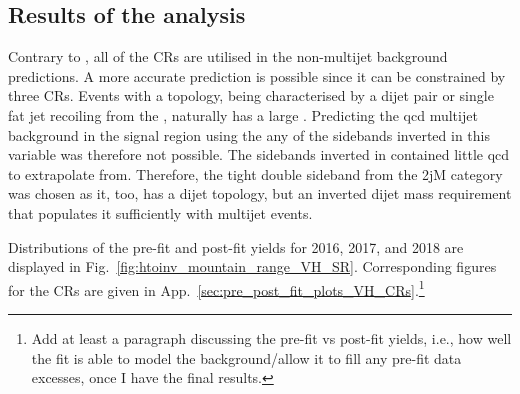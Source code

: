 \clearpage




\subsection{Results of the \texorpdfstring{\VH}{VH} analysis}
\label{subsec:htoinv_analysis_VH}

Contrary to \ttH, all of the \glspl{CR} are utilised in the non-multijet background predictions. A more accurate \ztonunu prediction is possible since it can be constrained by three \glspl{CR}. Events with a \VH topology, being characterised by a dijet pair or single fat jet recoiling from the \ptvecmiss, naturally has a large \mindphi. Predicting the \acrshort{qcd} multijet background in the signal region using the any of the sidebands inverted in this variable was therefore not possible. The sidebands inverted in \omegaTilde contained little \acrshort{qcd} to extrapolate from. Therefore, the tight double sideband from the \ggH 2jM category was chosen as it, too, has a dijet topology, but an inverted dijet mass requirement that populates it sufficiently with multijet events.

Distributions of the pre-fit and post-fit yields for 2016, 2017, and 2018 are displayed in Fig.~\ref{fig:htoinv_mountain_range_VH_SR}. Corresponding figures for the \glspl{CR} are given in App.~\ref{sec:pre_post_fit_plots_VH_CRs}.\footnote{Add at least a paragraph discussing the pre-fit vs post-fit yields, i.e., how well the fit is able to model the background/allow it to fill any pre-fit data excesses, once I have the final results.}

